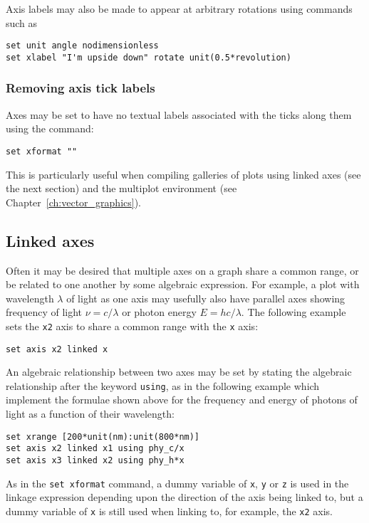 Axis labels may also be made to appear at arbitrary rotations using commands such as
\begin{verbatim}
set unit angle nodimensionless
set xlabel "I'm upside down" rotate unit(0.5*revolution)
\end{verbatim}

\subsubsection{Removing axis tick labels}

Axes may be set to have no textual labels associated with the ticks along them
using the command:
\begin{verbatim}
set xformat ""
\end{verbatim}
This is particularly useful when compiling galleries of plots using linked axes
(see the next section) and the multiplot environment (see
Chapter~\ref{ch:vector_graphics}).

\subsection{Linked axes}
\label{sec:linked_axes}

Often it may be desired that multiple axes on a graph share a common range, or
be related to one another by some algebraic expression. For example, a plot
with wavelength $\lambda$ of light as one axis may usefully also have parallel
axes showing frequency of light $\nu=c/\lambda$ or photon energy
$E=hc/\lambda$. The following example sets the {\tt x2} axis to share a common
range with the {\tt x} axis:
\begin{verbatim}
set axis x2 linked x
\end{verbatim}
An algebraic relationship between two axes may be set by stating the algebraic
relationship after the keyword {\tt using}, as in the following example which
implement the formulae shown above for the frequency and energy of photons of
light as a function of their wavelength:
\begin{verbatim}
set xrange [200*unit(nm):unit(800*nm)]
set axis x2 linked x1 using phy_c/x
set axis x3 linked x2 using phy_h*x
\end{verbatim}
As in the {\tt set xformat} command, a dummy variable of {\tt x}, {\tt y} or
{\tt z} is used in the linkage expression depending upon the direction of the
axis being linked to, but a dummy variable of {\tt x} is still used when
linking to, for example, the {\tt x2} axis.

